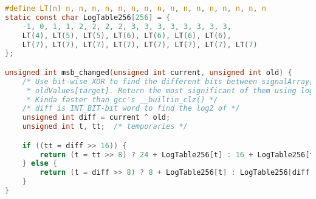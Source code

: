 \begin{lstlisting}[language=c, caption={msb\_changed()}, 
escapechar=$, label={lst:msb_changed}]
#define LT(n) n, n, n, n, n, n, n, n, n, n, n, n, n, n, n, n
static const char LogTable256[256] = {
    -1, 0, 1, 1, 2, 2, 2, 2, 3, 3, 3, 3, 3, 3, 3, 3,
    LT(4), LT(5), LT(5), LT(6), LT(6), LT(6), LT(6),
    LT(7), LT(7), LT(7), LT(7), LT(7), LT(7), LT(7), LT(7)
};

unsigned int msb_changed(unsigned int current, unsigned int old) {
    /* Use bit-wise XOR to find the different bits between signalArray[target] and
     * oldValues[target]. Return the most significant of them using log2.
     * Kinda faster than gcc's __builtin_clz() */
    /* diff is INT_BIT-bit word to find the log2 of */
    unsigned int diff = current ^ old;
    unsigned int t, tt;  /* temporaries */

    if ((tt = diff >> 16)) {
        return (t = tt >> 8) ? 24 + LogTable256[t] : 16 + LogTable256[tt];
    } else {
        return (t = diff >> 8) ? 8 + LogTable256[t] : LogTable256[diff];
    }
}
\end{lstlisting}